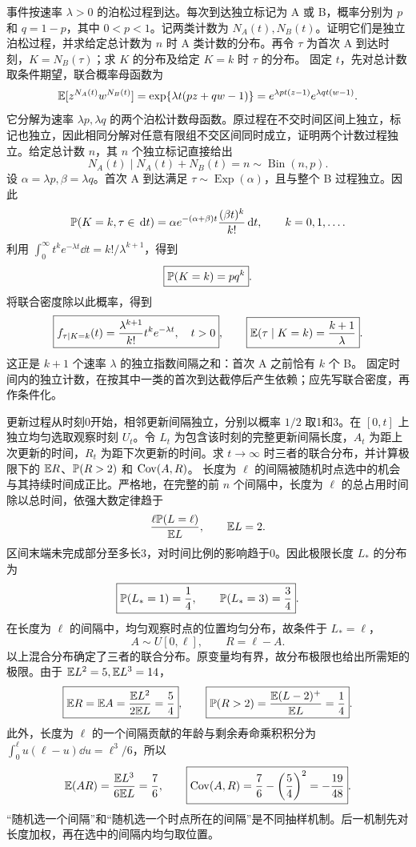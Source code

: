 事件按速率 $\lambda>0$ 的泊松过程到达。每次到达独立标记为 A 或 B，概率分别为 $p$ 和 $q=1-p$，其中 $0<p<1$。记两类计数为 $N_A(t),N_B(t)$。证明它们是独立泊松过程，并求给定总计数为 $n$ 时 A 类计数的分布。再令 $\tau$ 为首次 A 到达时刻，$K=N_B(\tau)$；求 $K$ 的分布及给定 $K=k$ 时 $\tau$ 的分布。
\solution 固定 $t$，先对总计数取条件期望，联合概率母函数为
\[
 \mathbb{E}[z^{N_A(t)}w^{N_B(t)}]
 =\exp\{\lambda t(pz+qw-1)\}
 =e^{\lambda pt(z-1)}e^{\lambda qt(w-1)}.
\]
它分解为速率 $\lambda p,\lambda q$ 的两个泊松计数母函数。原过程在不交时间区间上独立，标记也独立，因此相同分解对任意有限组不交区间同时成立，证明两个计数过程独立。给定总计数 $n$，其 $n$ 个独立标记直接给出
\[
 \boxed{N_A(t)\mid N_A(t)+N_B(t)=n\sim\operatorname{Bin}(n,p)}.
\]
设 $\alpha=\lambda p,\beta=\lambda q$。首次 A 到达满足 $\tau\sim\operatorname{Exp}(\alpha)$，且与整个 B 过程独立。因此
\[
 \mathbb{P}(K=k,\tau\in\,\mathrm{d} t)
 =\alpha e^{-(\alpha+\beta)t}\frac{(\beta t)^k}{k!}\,\mathrm{d} t,
 \qquad k=0,1,\ldots.
\]
利用 $\int_0^\infty t^ke^{-\lambda t}\dd t=k!/\lambda^{k+1}$，得到
\[
 \boxed{\mathbb{P}(K=k)=pq^k}.
\]
将联合密度除以此概率，得到
\[
 \boxed{f_{\tau\mid K=k}(t)=\frac{\lambda^{k+1}}{k!}t^ke^{-\lambda t},\quad t>0},
 \qquad \boxed{\mathbb{E}(\tau\mid K=k)=\frac{k+1}{\lambda}}.
\]
这正是 $k+1$ 个速率 $\lambda$ 的独立指数间隔之和：首次 A 之前恰有 $k$ 个 B。
\insight 固定时间内的独立计数，在按其中一类的首次到达截停后产生依赖；应先写联合密度，再作条件化。

更新过程从时刻0开始，相邻更新间隔独立，分别以概率 $1/2$ 取1和3。在 $[0,t]$ 上独立均匀选取观察时刻 $U_t$。令 $L_t$ 为包含该时刻的完整更新间隔长度，$A_t$ 为距上次更新的时间，$R_t$ 为距下次更新的时间。求 $t\to\infty$ 时三者的联合分布，并计算极限下的 $\mathbb{E} R$、$\mathbb{P}(R>2)$ 和 $\operatorname{Cov}(A,R)$。
\solution 长度为 $\ell$ 的间隔被随机时点选中的机会与其持续时间成正比。严格地，在完整的前 $n$ 个间隔中，长度为 $\ell$ 的总占用时间除以总时间，依强大数定律趋于
\[
 \frac{\ell\mathbb{P}(L=\ell)}{\mathbb{E} L},\qquad \mathbb{E} L=2.
\]
区间末端未完成部分至多长3，对时间比例的影响趋于0。因此极限长度 $L_*$ 的分布为
\[
 \boxed{\mathbb{P}(L_*=1)=\frac14,\qquad\mathbb{P}(L_*=3)=\frac34}.
\]
在长度为 $\ell$ 的间隔中，均匀观察时点的位置均匀分布，故条件于 $L_*=\ell$，
\[
 \boxed{A\sim U[0,\ell],\qquad R=\ell-A}.
\]
以上混合分布确定了三者的联合分布。原变量均有界，故分布极限也给出所需矩的极限。由于 $\mathbb{E} L^2=5,\mathbb{E} L^3=14$，
\[
 \boxed{\mathbb{E} R=\mathbb{E} A=\frac{\mathbb{E} L^2}{2\mathbb{E} L}=\frac54},\qquad
 \boxed{\mathbb{P}(R>2)=\frac{\mathbb{E}(L-2)^+}{\mathbb{E} L}=\frac14}.
\]
此外，长度为 $\ell$ 的一个间隔贡献的年龄与剩余寿命乘积积分为
$\int_0^\ell u(\ell-u)\dd u=\ell^3/6$，所以
\[
 \mathbb{E}(AR)=\frac{\mathbb{E} L^3}{6\mathbb{E} L}=\frac76,
 \qquad \boxed{\operatorname{Cov}(A,R)=\frac76-\left(\frac54\right)^2=-\frac{19}{48}}.
\]
\insight “随机选一个间隔”和“随机选一个时点所在的间隔”是不同抽样机制。后一机制先对长度加权，再在选中的间隔内均匀取位置。

